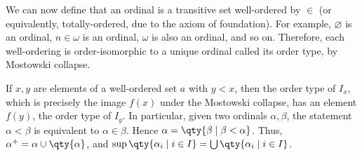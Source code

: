We can now define that an ordinal is a transitive set well-ordered by $\in$ (or equivalently, totally-ordered, due to the axiom of foundation).
For example, $\varnothing$ is an ordinal, $n \in \omega$ is an ordinal, $\omega$ is also an ordinal, and so on.
Therefore, each well-ordering is order-isomorphic to a unique ordinal called its order type, by Mostowski collapse.
\begin{remark}
    If $x, y$ are elements of a well-ordered set $a$ with $y < x$, then the order type of $I_x$, which is precisely the image $f(x)$ under the Mostowski collapse, has an element $f(y)$, the order type of $I_y$.
    In particular, given two ordinals $\alpha, \beta$, the statement $\alpha < \beta$ is equivalent to $\alpha \in \beta$.
    Hence $\alpha = \qty{\beta \mid \beta < \alpha}$.
    Thus, $\alpha^+ = \alpha \cup \qty{\alpha}$, and $\sup \qty{\alpha_i \mid i \in I} = \bigcup \qty{\alpha_i \mid i \in I}$.
\end{remark}


